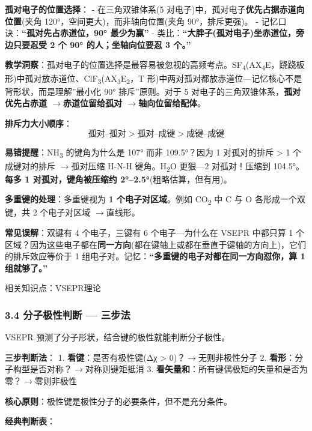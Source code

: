 \documentclass[a4paper,11pt]{ctexart}
\newcommand{\箭}{\ensuremath{\rightarrow}}
\newcommand{\左箭}{\ensuremath{\leftarrow}}
\newcommand{\上箭}{\ensuremath{\uparrow}}
\newcommand{\下箭}{\ensuremath{\downarrow}}
\newcommand{\衡}{\ensuremath{\rightleftharpoons}}
\newcommand{\双箭}{\ensuremath{\leftrightarrow}}
\newcommand{\约等于}{\ensuremath{\approx}}
\newcommand{\小于等于}{\ensuremath{\leq}}
\newcommand{\大于等于}{\ensuremath{\geq}}
\newcommand{\不等于}{\ensuremath{\neq}}
\newcommand{\西格马}{\ensuremath{\sigma}}
\newcommand{\派}{\ensuremath{\pi}}
\begin{document}
\textbf{孤对电子的位置选择}：
- 在三角双锥体系(5 对电子)中，孤对电子\textbf{优先占据赤道向位置}(夹角 120°，空间更大)，而非轴向位置(夹角 90°，排斥更强)。
- 记忆口诀：\textbf{``孤对先占赤道位，90° 最少为赢''}
- 类比：\textbf{``大胖子(孤对电子)坐赤道位，旁边只要忍受 2 个 90° 的人；坐轴向位要忍 3 个。''}

\textbf{教学洞察}：孤对电子的位置选择是最容易被忽视的高频考点。SF\textsubscript{4}(AX\textsubscript{4}E，跷跷板形)中孤对放赤道位、ClF\textsubscript{3}(AX\textsubscript{3}E\textsubscript{2}，T 形)中两对孤对都放赤道位---记忆核心不是背形状，而是理解''最小化 90° 排斥''原则。对于 5 对电子的三角双锥体系，\textbf{孤对优先占赤道 \箭 赤道位留给孤对 \箭 轴向位留给配体}。

\textbf{排斥力大小顺序}：
\[
\text{孤对–孤对} > \text{孤对–成键} > \text{成键–成键}
\]

\textbf{易错提醒}：NH\textsubscript{3} 的键角为什么是 107° 而非 109.5°？因为 1 对孤对的排斥 \textgreater{} 1 个成键对的排斥 \箭 孤对压缩 H-N-H 键角。H\textsubscript{2}O 更狠---2 对孤对！压缩到 104.5°。\textbf{每多 1 对孤对，键角被压缩约 2°--2.5°}(粗略估算，但有用)。

\textbf{多重键的处理}：多重键视为 \textbf{1 个电子对区域}。例如 CO\textsubscript{2} 中 C 与 O 各形成一个双键，共 2 个电子对区域 \箭 直线形。

\textbf{常见误解}：双键有 4 个电子，三键有 6 个电子---为什么在 VSEPR 中都只算 1 个区域？因为这些电子都在\textbf{同一方向}(都在键轴上或都在垂直于键轴的方向上)，它们的排斥效应等价于 1 组电子对。记忆：\textbf{``多重键的电子对都在同一方向怼你，算 1 组就够了。''}

相关知识点：VSEPR理论

\subsubsection{3.4 分子极性判断 --- 三步法}\label{ux5206ux5b50ux6781ux6027ux5224ux65ad-ux4e09ux6b65ux6cd5}

VSEPR 预测了分子形状，结合键的极性就能判断分子极性。

\textbf{三步判断法}：
1. \textbf{看键}：是否有极性键(Δχ \textgreater{} 0)？\箭 无则非极性分子
2. \textbf{看形}：分子构型是否对称？\箭 对称则键矩抵消
3. \textbf{看矢量和}：所有键偶极矩的矢量和是否为零？\箭 零则非极性

\textbf{核心原则}：极性键是极性分子的必要条件，但不是充分条件。

\textbf{经典判断表}：
\end{document}
